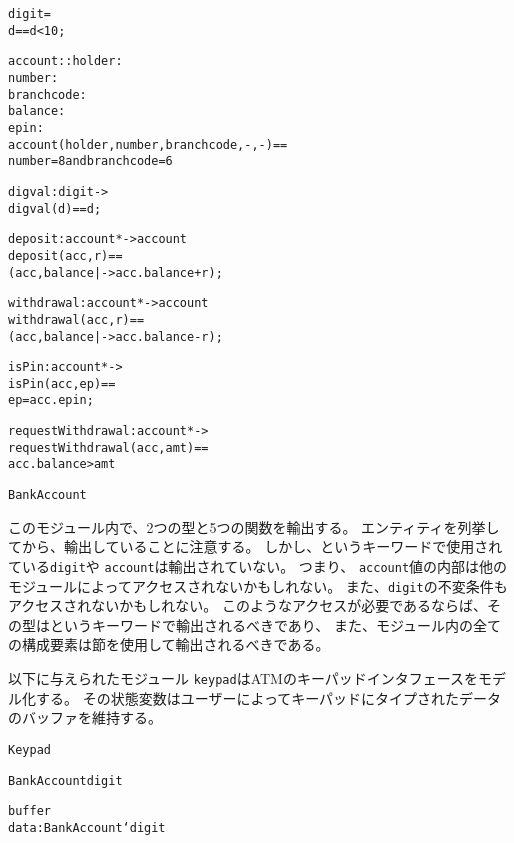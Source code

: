 \documentclass[\pformat,12pt]{jarticle}
\begin{document}
\begin{description}
\begin{alltt}

  digit = 
   d == d < 10;
  
  account::  holder : 
             number : 
             branchcode : 
             balance: 
             epin: 
  account(holder, number, branchcode,-,-) ==
     number = 8 and  branchcode = 6


    digval : digit -> 
    digval(d) == d;

    deposit: account *  -> account
    deposit(acc,r) == 
      (acc,balance |-> acc.balance + r);

    withdrawal : account *  -> account
    withdrawal (acc,r) == 
      (acc,balance |-> acc.balance - r);

    isPin : account *  -> 
    isPin(acc,ep) ==
      ep = acc.epin;

    requestWithdrawal : account *  -> 
    requestWithdrawal (acc,amt) ==
      acc.balance > amt

 BankAccount
\end{alltt}
このモジュール内で、2つの型と5つの関数を輸出する。
エンティティを列挙してから、輸出していることに注意する。
しかし、というキーワードで使用されている\texttt{digit}や \texttt{account}は輸出されていない。
つまり、 \texttt{account}値の内部は他のモジュールによってアクセスされないかもしれない。
また、\texttt{digit}の不変条件もアクセスされないかもしれない。
このようなアクセスが必要であるならば、その型はというキーワードで輸出されるべきであり、
また、モジュール内の全ての構成要素は節を使用して輸出されるべきである。

以下に与えられたモジュール \texttt{keypad}はATMのキーパッドインタフェースをモデル化する。 
その状態変数はユーザーによってキーパッドにタイプされたデータのバッファを維持する。


\begin{alltt}
 Keypad

     BankAccount  digit



   buffer 
    data :  BankAccount`digit


\end{alltt}
\end{description}
\end{document}
